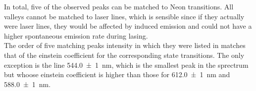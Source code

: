 \documentclass[../main.tex]{subfiles}
\begin{document}
     \noindent In total, five of the observed peaks can be matched to Neon transitions. All valleys cannot be matched to laser lines, which is sensible since if they actually were laser lines, they would be affected by induced emission and could not have a higher spontaneous emission rate during lasing.\\
     
     \noindent The order of five matching peaks intensity in which they were listed in matches that of the einstein coefficient for the corresponding state transitions. The only exception is the line \SI{544.0(10)}{\nm}, which is the smallest peak in the sprectrum but whoose einstein coefficient is higher than those for \SI{612.0(10)}{\nm} and \SI{588.0(10)}{\nm}.
\end{document}
